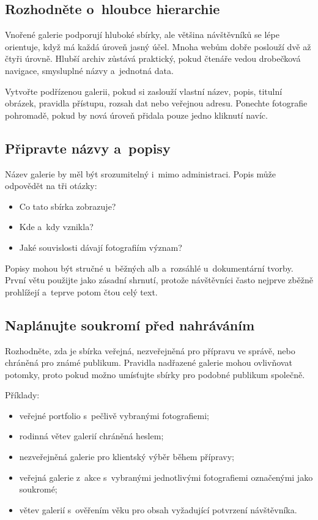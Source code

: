 \documentclass[11pt,a4paper]{article}
\begin{document}
\subsection{Rozhodněte o~hloubce hierarchie}

Vnořené galerie podporují hluboké sbírky, ale většina návštěvníků se lépe
orientuje, když má každá úroveň jasný účel. Mnoha webům dobře poslouží dvě až
čtyři úrovně. Hlubší archiv zůstává praktický, pokud čtenáře vedou drobečková
navigace, smysluplné názvy a~jednotná data.

Vytvořte podřízenou galerii, pokud si zaslouží vlastní název, popis, titulní
obrázek, pravidla přístupu, rozsah dat nebo veřejnou adresu. Ponechte fotografie
pohromadě, pokud by nová úroveň přidala pouze jedno kliknutí navíc.

\subsection{Připravte názvy a~popisy}

Název galerie by měl být srozumitelný i~mimo administraci. Popis může odpovědět
na tři otázky:

\begin{itemize}
  \item Co tato sbírka zobrazuje?
  \item Kde a~kdy vznikla?
  \item Jaké souvislosti dávají fotografiím význam?
\end{itemize}

Popisy mohou být stručné u~běžných alb a~rozsáhlé u~dokumentární tvorby. První
větu použijte jako zásadní shrnutí, protože návštěvníci často nejprve zběžně
prohlížejí a~teprve potom čtou celý text.

\subsection{Naplánujte soukromí před nahráváním}

Rozhodněte, zda je sbírka veřejná, nezveřejněná pro přípravu ve správě, nebo
chráněná pro známé publikum. Pravidla nadřazené galerie mohou ovlivňovat
potomky, proto pokud možno umísťujte sbírky pro podobné publikum společně.

Příklady:

\begin{itemize}
  \item veřejné portfolio s~pečlivě vybranými fotografiemi;
  \item rodinná větev galerií chráněná heslem;
  \item nezveřejněná galerie pro klientský výběr během přípravy;
  \item veřejná galerie z~akce s~vybranými jednotlivými fotografiemi označenými
  jako soukromé;
  \item větev galerií s~ověřením věku pro obsah vyžadující potvrzení
  návštěvníka.
\end{itemize}
\end{document}
